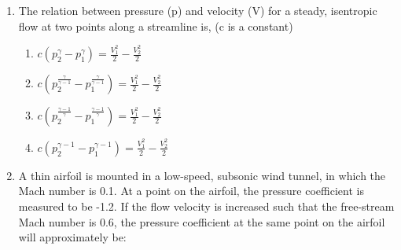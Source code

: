 \documentclass[journal,12pt,onecolumn]{IEEEtran}
\theoremstyle{remark}
\begin{document}
\begin{enumerate}
    \begin{enumerate}
    \end{enumerate}

    \item The relation between pressure (p) and velocity (V) for a steady, isentropic flow at two points along a streamline is, (c is a constant)
    \hfill{}

    \begin{enumerate}
        \item $c(p_{2}^{\gamma}-p_{1}^{\gamma})=\frac{V_{1}^{2}}{2}-\frac{V_{2}^{2}}{2}$
        \item $c(p_{2}^{\frac{\gamma}{\gamma-1}}-p_{1}^{\frac{\gamma}{\gamma-1}})=\frac{V_{1}^{2}}{2}-\frac{V_{2}^{2}}{2}$
        \item $c(p_{2}^{\frac{\gamma-1}{\gamma}}-p_{1}^{\frac{\gamma-1}{\gamma}})=\frac{V_{1}^{2}}{2}-\frac{V_{2}^{2}}{2}$
        \item $c(p_{2}^{\gamma-1}-p_{1}^{\gamma-1})=\frac{V_{1}^{2}}{2}-\frac{V_{2}^{2}}{2}$
    \end{enumerate}

    \item A thin airfoil is mounted in a low-speed, subsonic wind tunnel, in which the Mach number is 0.1. At a point on the airfoil, the pressure coefficient is measured to be -1.2. If the flow velocity is increased such that the free-stream Mach number is 0.6, the pressure coefficient at the same point on the airfoil will approximately be:
    \hfill{}

    \begin{enumerate}
    \end{enumerate}


\end{enumerate}
\end{document}
